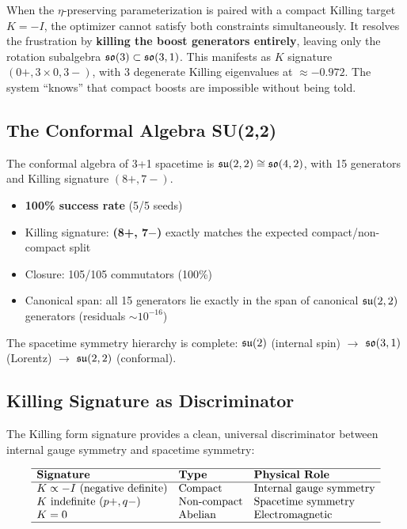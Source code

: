 When the $\eta$-preserving parameterization is paired with a compact Killing target $K = -I$, the optimizer cannot satisfy both constraints simultaneously. It resolves the frustration by \textbf{killing the boost generators entirely}, leaving only the rotation subalgebra $\mathfrak{so}(3) \subset \mathfrak{so}(3,1)$. This manifests as $K$ signature $(0+, 3 \times 0, 3-)$, with 3 degenerate Killing eigenvalues at $\approx -0.972$. The system ``knows'' that compact boosts are impossible without being told.

\subsection{The Conformal Algebra SU(2,2)}\label{sec:su22}

The conformal algebra of 3+1 spacetime is $\mathfrak{su}(2,2) \cong \mathfrak{so}(4,2)$, with 15 generators and Killing signature $(8+, 7-)$.

\begin{itemize}
\item \textbf{100\% success rate} (5/5 seeds)
\item Killing signature: \textbf{(8+, 7$-$)} exactly matches the expected compact/non-compact split
\item Closure: 105/105 commutators (100\%)
\item Canonical span: all 15 generators lie exactly in the span of canonical $\mathfrak{su}(2,2)$ generators (residuals $\sim 10^{-16}$)
\end{itemize}

The spacetime symmetry hierarchy is complete: $\mathfrak{su}(2)$ (internal spin) $\to$ $\mathfrak{so}(3,1)$ (Lorentz) $\to$ $\mathfrak{su}(2,2)$ (conformal).

\subsection{Killing Signature as Discriminator}\label{sec:signature_discriminator}

The Killing form signature provides a clean, universal discriminator between internal gauge symmetry and spacetime symmetry:

\begin{equation}
\begin{array}{lll}
\hline
\textbf{Signature} & \textbf{Type} & \textbf{Physical Role} \\
\hline
K \propto -I \text{ (negative definite)} & \text{Compact} & \text{Internal gauge symmetry} \\
K \text{ indefinite } (p+, q-) & \text{Non-compact} & \text{Spacetime symmetry} \\
K = 0 & \text{Abelian} & \text{Electromagnetic} \\
\hline
\end{array}
\end{equation}


